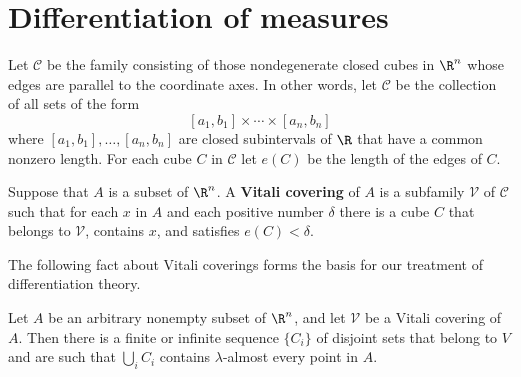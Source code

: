 \section{Differentiation of measures}
Let $\mathcal{C}$ be the family consisting of those nondegenerate closed cubes in $\R^n$ whose edges are parallel to the coordinate axes. In other words, let $\mathcal{C}$ be the collection of all sets of the form
\[[a_1,b_1]\times\cdots\times[a_n,b_n]\]
where $[a_1,b_1],\dots,[a_n,b_n]$ are closed subintervals of $\R$ that have a common nonzero length. For each cube $C$ in $\mathcal{C}$ let $e(C)$ be the length of the edges of $C$.\par
Suppose that $A$ is a subset of $\R^n$. A \textbf{Vitali covering} of $A$ is a subfamily $\mathcal{V}$ of $\mathcal{C}$ such that for each $x$ in $A$ and each positive number $\delta$ there is a cube $C$ that belongs to $\mathcal{V}$, contains $x$, and satisfies $e(C)<\delta$.\par
The following fact about Vitali coverings forms the basis for our treatment of differentiation theory.
\begin{theorem}
Let $A$ be an arbitrary nonempty subset of $\R^n$, and let $\mathcal{V}$ be a Vitali covering of $A$. Then there is a finite or infinite sequence $\{C_i\}$ of disjoint sets that belong to $V$ and are such that $\bigcup_iC_i$ contains $\lambda$-almost every point in $A$.
\end{theorem}
